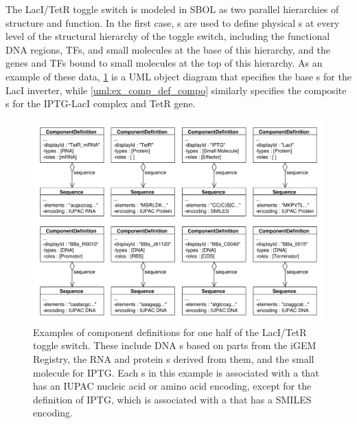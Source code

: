 The LacI/TetR toggle switch is modeled in SBOL as two parallel hierarchies of structure and function. In the first case, s are used to define physical s at every level of the structural hierarchy of the toggle switch, including the functional DNA regions, TFs, and small molecules at the base of this hierarchy, and the genes and TFs bound to small molecules at the top of this hierarchy. As an example of these data, \ref{uml:ex_comp_defs} is a UML object diagram that specifies the base s for the LacI inverter, while \ref{uml:ex_comp_def_compo} similarly specifies the composite s for the IPTG-LacI complex and TetR gene. 

\begin{figure}[ht]
\begin{center}
\includegraphics[width=\textwidth]{example_uml/toggle_1}
\caption[]{Examples of component definitions for one half of the LacI/TetR toggle switch. These include DNA s based on parts from the iGEM Registry, the RNA and protein s derived from them, and the small molecule  for IPTG. Each s in this example is associated with a  that has an IUPAC nucleic acid or amino acid encoding, except for the definition of IPTG, which is associated with a  that has a SMILES encoding.}
\label{uml:ex_comp_defs}
\end{center}
\end{figure}

